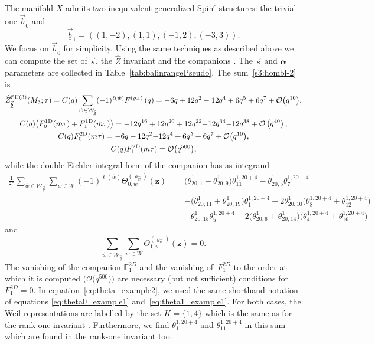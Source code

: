 \documentclass[pdftex]{sigma}
\def\BE{\mathbb{E}}
\def\bv{{\vec{\underline{b}}}}
\def\bal{\boldsymbol{\alpha}}
\theoremstyle{definition}
\numberwithin{equation}{section}
\begin{document}
The manifold $X$ admits two inequivalent generalized Spin$^c$ structures: the trivial one $\vec{\underline{b}}_0$ and
\begin{equation*}
\vec{\underline{b}}_{1}= ( (1, -2 ), (1, 1 ), (-1, 2 ), (-3, 3 ) ).
\end{equation*}
 We focus on $\vec{\underline{b}}_{0}$ for simplicity. Using the same techniques as described above we can compute the set of $\vec{s}$, the $\widehat{Z}$ invariant and the companions . The $\vec{s}$ and $\bal$ parameters are collected in Table~\ref{tab:balinrangePseudo}. The sum~\eqref{s3:hombl-2} is
\begin{gather*}
 \widehat Z^{{\rm SU}(3)}_\bv(M_3;\tau)= C(q)\sum_{\hat{w}\in\mathcal W_{\vec{\underline{b}}}}(-1)^{\ell(\hat{w})}F^{\left( \varrho_{\hat{w}} \right)}\left( q \right)= -6q + 12q^2 -12q^4 + 6q^5 + 6q^7 + \mathcal{O}\bigl(q^{10}\bigr),\\
 C(q)\bigl(F_{0}^{\text{1D}}(m\tau)+F_{1}^{\text{1D}}(m\tau)\bigr) ={-12} q^{16} + 12 q^{20} + 12 q^{22} {-12} q^{34} {-12} q^{38} + \mathcal{O}\left(q^{40}\right), \\
 C(q)F_{0}^{\text{2D}}(m\tau) = {-6} q + 12 q^{2} {-12} q^{4} + 6 q^{5} + 6 q^{7} + \mathcal{O}\bigl(q^{10}\bigr),
\\
 C(q)F_{1}^{\text{2D}}(m\tau) = \mathcal{O}\bigl( q^{500} \bigr),
\end{gather*}
while the double Eichler integral form of the companion has as integrand
\begin{align}
\frac{1}{80} \sum_{\hat{w}\in \mathcal{W}_{\vec{\underline{b}}}}\sum_{w\in W}(-1)^{\ell(\hat{w})}\Theta^{(\varrho_{\hat{w}})}_{0,w}(\mathbf z) ={}& \bigl(\theta^{1}_{20,1}+\theta^{1}_{20,9}\bigr)\theta_{11}^{1,20+4}-\theta^{1}_{20,5}\theta_{7}^{1,20+4}\nonumber\\
 &-\bigl(\theta^{1}_{20,11}+\theta^{1}_{20,19}\bigr)\theta_{1}^{1,20+4}+2\theta^{1}_{20,10}\bigl(\theta^{1,20+4}_{8}+\theta^{1,20+4}_{12}\bigr)\nonumber\\
 &-\theta^{1}_{20,15}\theta_{5}^{1,20+4}-2\bigl(\theta^{1}_{20,6}+\theta^{1}_{20,14}\bigr)\bigl(\theta^{1,20+4}_{4}+\theta^{1,20+4}_{16}\bigr)\!\!\!\label{eq:theta_example2}
\end{align}
and
\[\sum_{\hat{w}\in \mathcal{W}_{\vec{\underline{b}}}}\sum_{w\in W}\Theta^{(\varrho_{\hat{w}})}_{1,w}(\mathbf z)=0.\]
The vanishing of the companion $\BE_{1}^{2D}$ and the vanishing of~$F_{1}^{2D}$ to the order at which it is computed $\bigl(\mathcal{O}\bigl(q^{500}\bigr)\bigr)$ are necessary (but not sufficient) conditions for~$F_{1}^{2D}=0$.
In equation~\eqref{eq:theta_example2}, we used the same shorthand notation of equations \eqref{eq:theta0_example1} and~\eqref{eq:theta1_example1}. For both cases, the Weil representations are labelled by the set $K= \{ 1,4 \}$ which is the same as for the rank-one invariant  \cite{cheng20193d}. Furthermore, we find $\theta_{1}^{1,20+4}$ and $\theta_{11}^{1,20+4}$ in this sum which are found in the rank-one invariant too.
\end{document}
